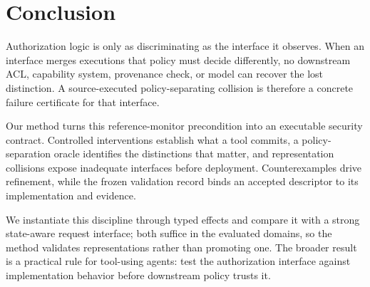 \section{Conclusion}

Authorization logic is only as discriminating as the interface it observes.
When an interface merges executions that policy must decide differently, no
downstream ACL, capability system, provenance check, or model can recover the
lost distinction. A source-executed policy-separating collision is therefore a
concrete failure certificate for that interface.

Our method turns this reference-monitor precondition into an executable
security contract. Controlled interventions establish what a tool commits, a
policy-separation oracle identifies the distinctions that matter, and
representation collisions expose inadequate interfaces before deployment.
Counterexamples drive refinement, while the frozen validation record binds an
accepted descriptor to its implementation and evidence.

We instantiate this discipline through typed effects and compare it with a
strong state-aware request interface; both suffice in the evaluated domains,
so the method validates representations rather than promoting one. The broader
result is a practical rule for tool-using agents: test the authorization
interface against implementation behavior before downstream policy trusts it.
\label{technical-body-end}
